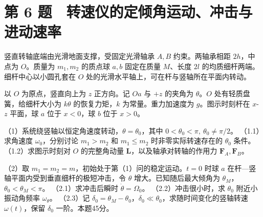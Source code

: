 \documentclass[12pt,a4paper,fontset=fandol]{ctexart}
\begin{document}
\clearpage

\section{第 6
题　转速仪的定倾角运动、冲击与进动速率}\label{ux7b2c-6-ux9898-ux8f6cux901fux4eeaux7684ux5b9aux503eux89d2ux8fd0ux52a8ux51b2ux51fbux4e0eux8fdbux52a8ux901fux7387}

竖直转轴底端由光滑地面支撑，受固定光滑轴承 \(A,B\) 约束。两轴承相距
\(2h\)，中点为 \(O\)。质量为 \(m_1,m_2\) 的质点球 \(a,b\) 固定在质量
\(M\)、长度 \(2l\) 的均质细杆两端。细杆中心以小圆孔套在 \(O\)
处的光滑水平轴上，可在杆与竖轴所在平面内转动。

以 \(O\) 为原点，竖直向上为 \(z\) 正方向。记 \(Oa\) 与 \(+z\) 的夹角为
\(\theta\)。\(O\) 处有轻质盘簧，给细杆大小为 \(k\theta\)
的恢复力矩，\(k\) 为常量。重力加速度为 \(g\)。图示时刻杆在 \(x\)-\(z\)
平面，球 \(a\) 位于 \(x<0\)，球 \(b\) 位于 \(x>0\)。

（1）系统绕竖轴以恒定角速度转动，\(\theta=\theta_0\)，其中
\(0<\theta_0<\pi,\ \theta_0\ne\pi/2\)。 （1.1）求角速度
\(\omega_0\)，分别讨论 \(m_1>m_2\) 和 \(m_1\le m_2\)
时非零实际转速存在的 \(\theta_0\) 条件。 （1.2）求图示时刻对 \(O\)
的完整角动量 \(\mathbf L\)，以及轴承对转轴的作用力
\(\mathbf F_A,\mathbf F_B\)。

（2）取 \(m_1=m_2=m\)，初始处于第（1）问的稳定运动。\(t=0\) 时球 \(a\)
在杆---竖轴平面内受到垂直细杆的极短冲击，令 \(\theta\)
增大。已知随后最大倾角为 \(\theta_M\)，\(\theta_0<\theta_M<\pi\)。
（2.1）求冲击后瞬时 \(\dot\theta=\Omega_0\)。 （2.2）冲击很小时，求
\(\theta_0\) 附近小振动角频率 \(\omega_\theta\)。 （2.3）记
\(\delta_0=\theta_M-\theta_0\)，\(\delta_0\ll\theta_0\)，求随时间变化的竖轴转速
\(\omega(t)\)，保留 \(\delta_0\) 一阶。本题45分。

\begin{center}
\begin{minipage}{\linewidth}
\centering\begingroup
{}
\ifdim\wd\diagrambox>.88\linewidth
\sbox{\diagrambox}{\resizebox{.88\linewidth}{!}{\usebox{\diagrambox}}}
\fi
\ifdim\ht\diagrambox>.40\textheight
\resizebox{!}{.40\textheight}{\usebox{\diagrambox}}
\else\usebox{\diagrambox}\fi
\par{}
\endgroup\end{minipage}
\end{center}
\end{document}
